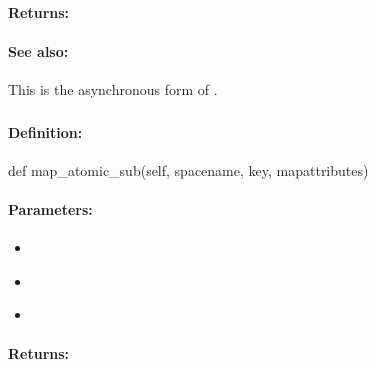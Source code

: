 \paragraph{Returns:}


\paragraph{See also:}  This is the asynchronous form of .

\pagebreak
\subsubsection{}
\label{api:python:map_atomic_sub}


\paragraph{Definition:}
\begin{pythoncode}
def map_atomic_sub(self, spacename, key, mapattributes)
\end{pythoncode}

\paragraph{Parameters:}
\begin{itemize}[noitemsep]
\item {}\\

\item {}\\

\item {}\\

\end{itemize}

\paragraph{Returns:}


\pagebreak
\subsubsection{}
\label{api:python:async_map_atomic_sub}


